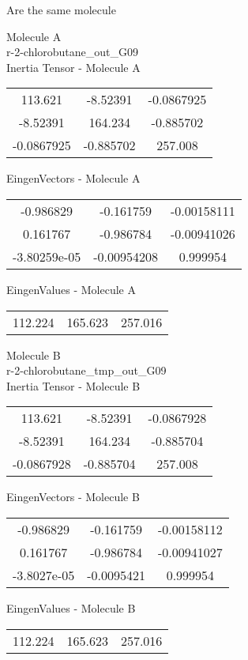 \begin{center}
\vtab
\vtab
\textcolor{NavyBlue}{\Large Are the same molecule}
\end{center}
\newpage
\begin{multicols}{2}
\begin{center}
Molecule A \\ 
r-2-chlorobutane\_out\_G09
\\
Inertia Tensor - Molecule A \\
\vtab
\begin{tabular}{|c c c|}
113.621	 & 	-8.52391	 & 	-0.0867925	 \\
-8.52391	 & 	164.234	 & 	-0.885702	 \\
-0.0867925	 & 	-0.885702	 & 	257.008
\end{tabular}

\vtab
 EingenVectors - Molecule A     \\
\vtab
\begin{tabular}{|c c c|}
-0.986829	 & 	-0.161759	 & 	-0.00158111	 \\
0.161767	 & 	-0.986784	 & 	-0.00941026	 \\
-3.80259e-05	 & 	-0.00954208	 & 	0.999954
\end{tabular}

\vtab
 EingenValues - Molecule A     \\
\vtab
\begin{tabular}{|c c c|}
112.224	 & 	165.623	 & 	257.016
\end{tabular}
\columnbreak

Molecule B \\ 
r-2-chlorobutane\_tmp\_out\_G09
\\
Inertia Tensor - Molecule B \\
\vtab
\begin{tabular}{|c c c|}
113.621	 & 	-8.52391	 & 	-0.0867928	 \\
-8.52391	 & 	164.234	 & 	-0.885704	 \\
-0.0867928	 & 	-0.885704	 & 	257.008
\end{tabular}

\vtab
 EingenVectors - Molecule B     \\
\vtab
\begin{tabular}{|c c c|}
-0.986829	 & 	-0.161759	 & 	-0.00158112	 \\
0.161767	 & 	-0.986784	 & 	-0.00941027	 \\
-3.8027e-05	 & 	-0.0095421	 & 	0.999954
\end{tabular}

\vtab
 EingenValues - Molecule B     \\
\vtab
\begin{tabular}{|c c c|}
112.224	 & 	165.623	 & 	257.016
\end{tabular}

\end{center}
\end{multicols}
